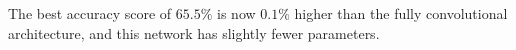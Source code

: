 The best accuracy score of $65.5\%$ is now $0.1\%$ higher than the fully
convolutional architecture, and this network has slightly fewer parameters.


